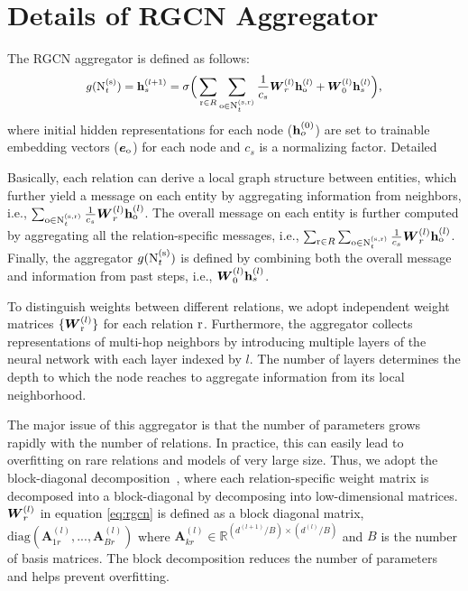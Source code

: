 \section{Details of RGCN Aggregator}
\label{sec:rgcn}
The RGCN aggregator is defined as follows:
\begin{equation}
\label{eq:rgcn}
    \small g(\text{N}^{(\mathrm{s})}_t)= \mathbf{h}_s^{(l+1)} = \sigma\Big(\sum_{\mathrm{r}\in R}\sum_{\mathrm{o} \in \text{N}_t^{(\mathrm{s},\mathrm{r})}} \frac{1}{c_s} \boldsymbol{W}_r^{(l)} \mathbf{h}_{\mathrm{o}}^{(l)} + \boldsymbol{W}_0^{(l)} \mathbf{h}_s^{(l)}\Big), 
\end{equation}
where initial hidden representations for each node ($\mathbf{h}_o^{(0)}$) are set to trainable embedding vectors ($\boldsymbol{e}_{\mathrm{o}}$) for each node and $c_s$ is a normalizing factor. Detailed

Basically, each relation can derive a local graph structure between entities, which further yield a message on each entity by aggregating information from neighbors, i.e., {\small  $\sum_{\mathrm{o} \in \text{N}_t^{(\mathrm{s},\mathrm{r})}} \allowbreak \frac{1}{c_s} \boldsymbol{W}_r^{(l)} \mathbf{h}_{\mathrm{o}}^{(l)}$}. The overall message on each entity is further computed by aggregating all the relation-specific messages, i.e., {\small $\sum_{\mathrm{r}\in R}\sum_{\mathrm{o} \in \text{N}_t^{(\mathrm{s},\mathrm{r})}}\allowbreak \frac{1}{c_s} \boldsymbol{W}_r^{(l)} \mathbf{h}_{\mathrm{o}}^{(l)}$}. Finally, the aggregator {\small  $g(\text{N}^{(\mathrm{s})}_t)$} is defined by combining both the overall message and information from past steps, i.e., {\small $\boldsymbol{W}_0^{(l)} \mathbf{h}_s^{(l)}$}.

To distinguish weights between different relations, we adopt independent weight matrices $\{ \boldsymbol{W}_{\mathrm{r}}^{(l)} \}$ for each relation $\mathrm{r}$. Furthermore, the aggregator collects representations of multi-hop neighbors by introducing multiple layers of the neural network with each layer indexed by $l$.
The number of layers determines the depth to which the node reaches to aggregate information from its local neighborhood. 

The major issue of this aggregator is that the number of parameters grows rapidly with the number of relations.
In practice, this can easily lead to overfitting on rare relations and models of very large size.
Thus, we adopt the block-diagonal decomposition~\citep{Schlichtkrull2018ModelingRD}, where each relation-specific weight matrix is decomposed into a block-diagonal by decomposing into low-dimensional matrices.
$\boldsymbol{W}_r^{(l)}$ in equation \eqref{eq:rgcn} is defined as a block diagonal matrix, $\text{diag}(\mathbf{A}_{1r}^{(l)},..., \mathbf{A}_{Br}^{(l)})$ where {\small $\mathbf{A}_{kr}^{(l)} \in \mathbb{R}^{(d^{(l+1)}/B) \times (d^{(l)}/B)}$} and $B$ is the number of basis matrices.
The block decomposition reduces the number of parameters and helps prevent overfitting.

